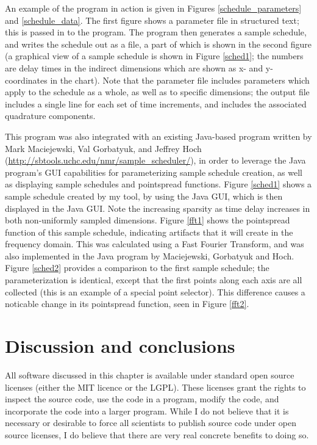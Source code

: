 An example of the program in action is given in Figures \ref{schedule_parameters} 
and \ref{schedule_data}.  The first figure shows a parameter file in structured
text; this is passed in to the program.  The program then generates a sample
schedule, and writes the schedule out as a file, a part of which is shown in
the second figure (a graphical view of a sample schedule is shown in Figure \ref{sched1};
the numbers are delay times in the indirect dimensions which are shown as x- 
and y-coordinates in the chart).  Note that the parameter file includes parameters which 
apply to the schedule as a whole, as well as to specific dimensions; the output
file includes a single line for each set of time increments, and includes the
associated quadrature components.



This program was also integrated with an existing Java-based program written
by Mark Maciejewski, Val Gorbatyuk, and Jeffrey Hoch 
(\url{http://sbtools.uchc.edu/nmr/sample_scheduler/}), in order to leverage
the Java program's GUI capabilities for parameterizing sample schedule creation,
as well as displaying sample schedules and pointspread functions.  
Figure \ref{sched1} shows a sample schedule created by my tool, by using the
Java GUI, which is then displayed in the Java GUI.  Note the increasing
sparsity as time delay increases in both non-uniformly sampled dimensions.
Figure \ref{fft1} shows the pointspread function of this sample schedule,
indicating artifacts that it will create in the frequency domain.  This was 
calculated using a Fast Fourier Transform, and was also implemented in the
Java program by Maciejewski, Gorbatyuk and Hoch.  Figure \ref{sched2} provides
a comparison to the first sample schedule; the parameterization is identical,
except that the first points along each axis are all collected (this is an
example of a special point selector).  This difference causes a noticable 
change in its pointspread function, seen in Figure \ref{fft2}.





\section{Discussion and conclusions}


All software discussed in this chapter is available under standard open source
licenses (either the MIT licence or the LGPL).  These licenses grant the rights
to inspect the source code, use the code in a program, modify the code, and
incorporate the code into a larger program.  While I do not believe that it is
necessary or desirable to force all scientists to publish source code under
open source licenses, I do believe that there are very real concrete benefits
to doing so.  

